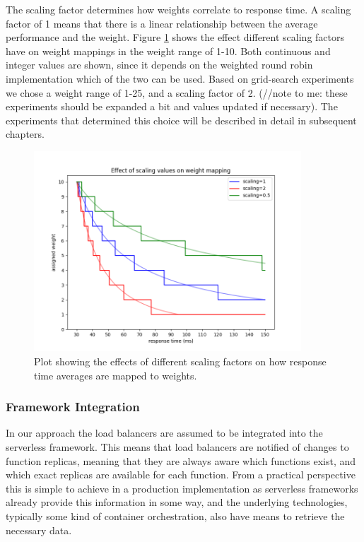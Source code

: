 The scaling factor determines how weights correlate to response time. A scaling factor of 1 means that there is a linear relationship between the average performance and the weight.
Figure \ref{fig:weight_mapping_example} shows the effect different scaling factors have on weight mappings in the weight range of 1-10. Both continuous and integer values are shown, since it depends on the weighted round robin implementation which of the two can be used.
Based on grid-search experiments we chose a weight range of 1-25, and a scaling factor of 2. (//note to me: these experiments should be expanded a bit and values updated if necessary).
The experiments that determined this choice will be described in detail in subsequent chapters.


\begin{figure}
    \centering
    \includegraphics[width=10cm]{graphics/graphs/weight_mapping_scaling_example.png}
    \caption{Plot showing the effects of different scaling factors on how response time averages are mapped to weights.}
    \label{fig:weight_mapping_example}
\end{figure}


\subsubsection{Framework Integration}
In our approach the load balancers are assumed to be integrated into the serverless framework.
This means that load balancers are notified of changes to function replicas, meaning that they are always aware which functions exist, and which exact replicas are available for each function.
From a practical perspective this is simple to achieve in a production implementation as serverless frameworks already provide this information in some way, and the underlying technologies, typically some kind of container orchestration, also have means to retrieve the necessary data.

